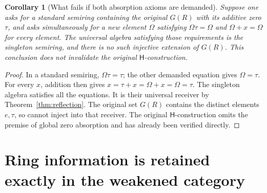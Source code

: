 \documentclass[11pt]{article}
\newtheorem{corollary}[theorem]{Corollary}
\theoremstyle{definition}
\newcommand{\HH}{\mathsf H}
\newcommand{\Om}{\Omega}
\begin{document}
\begin{corollary}[What fails if both absorption axioms are demanded]
Suppose one asks for a standard semiring containing the original \(G(R)\)
with its additive zero \(\tau\), and asks simultaneously for a new element
\(\Om\) satisfying \(\Om\tau=\Om\) and \(\Om+x=\Om\) for every
element. The universal algebra satisfying those requirements is the
singleton semiring, and there is no such injective extension of \(G(R)\).
This conclusion does not invalidate the original \(\HH\)-construction.
\end{corollary}
\begin{proof}
In a standard semiring, \(\Om\tau=\tau\); the other demanded equation
gives \(\Om=\tau\). For every \(x\), addition then gives
\(x=\tau+x=\Om+x=\Om=\tau\). The singleton algebra satisfies all
the equations. It is their universal receiver by
Theorem~\ref{thm:reflection}. The original set \(G(R)\) contains the
distinct elements \(e,\tau\), so cannot inject into that receiver.
The original \(\HH\)-construction omits the premise of global zero
absorption and has already been verified directly.
\end{proof}

\section{Ring information is retained exactly in the weakened category}
\end{document}
